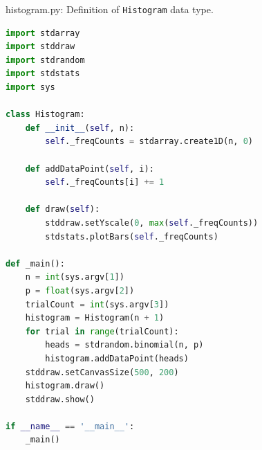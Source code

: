 \documentclass[8pt,a4paper,compress]{beamer}
\begin{document}
\begin{frame}[fragile]
\pause

\begin{framed}
\tiny histogram.py: Definition of \lstinline{Histogram} data type.
\end{framed}

\begin{lstlisting}[language=python,style=focusin]
import stdarray
import stddraw
import stdrandom
import stdstats
import sys

class Histogram:
    def __init__(self, n):
        self._freqCounts = stdarray.create1D(n, 0)

    def addDataPoint(self, i):
        self._freqCounts[i] += 1

    def draw(self):
        stddraw.setYscale(0, max(self._freqCounts))
        stdstats.plotBars(self._freqCounts)

def _main():
    n = int(sys.argv[1]) 
    p = float(sys.argv[2])
    trialCount = int(sys.argv[3]) 
    histogram = Histogram(n + 1)
    for trial in range(trialCount):
        heads = stdrandom.binomial(n, p)
        histogram.addDataPoint(heads)
    stddraw.setCanvasSize(500, 200)
    histogram.draw()
    stddraw.show()

if __name__ == '__main__':
    _main()
\end{lstlisting}
\end{frame}
\end{document}
